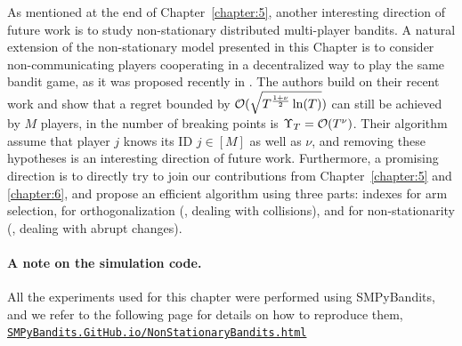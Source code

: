 As mentioned at the end of Chapter~\ref{chapter:5}, another interesting direction of future work is to study non-stationary distributed multi-player bandits.
A natural extension of the non-stationary model presented in this Chapter is to consider non-communicating players cooperating in a decentralized way to play the same bandit game, as it was proposed recently in \cite{WeiSrivastava18Distributed}.
The authors build on their recent work \cite{WeiSrivastava18Abruptly} and show that a regret bounded by $\mathcal{O}(\sqrt{T^{\frac{1+\nu}{2}} \ln(T)})$ can still be achieved by $M$ players, in the number of breaking points is $\Upsilon_T = \mathcal{O}(T^{\nu})$.
Their algorithm assume that player $j$ knows its ID $j\in[M]$ as well as $\nu$, and removing these hypotheses is an interesting direction of future work.
Furthermore, a promising direction is to directly try to join our contributions from Chapter~\ref{chapter:5} and \ref{chapter:6}, and propose an efficient algorithm using three parts:
\klUCB{} indexes for arm selection,
\MCTopM{} for orthogonalization (\ie, dealing with collisions),
and \GLRklUCB{} for non-stationarity (\ie, dealing with abrupt changes).
%



\paragraph{A note on the simulation code.}
%
All the experiments used for this chapter were performed using SMPyBandits,
and we refer to the following page for details on how to reproduce them,
\href{https://SMPyBandits.GitHub.io/NonStationaryBandits.html}{\texttt{SMPyBandits.GitHub.io/NonStationaryBandits.html}}
